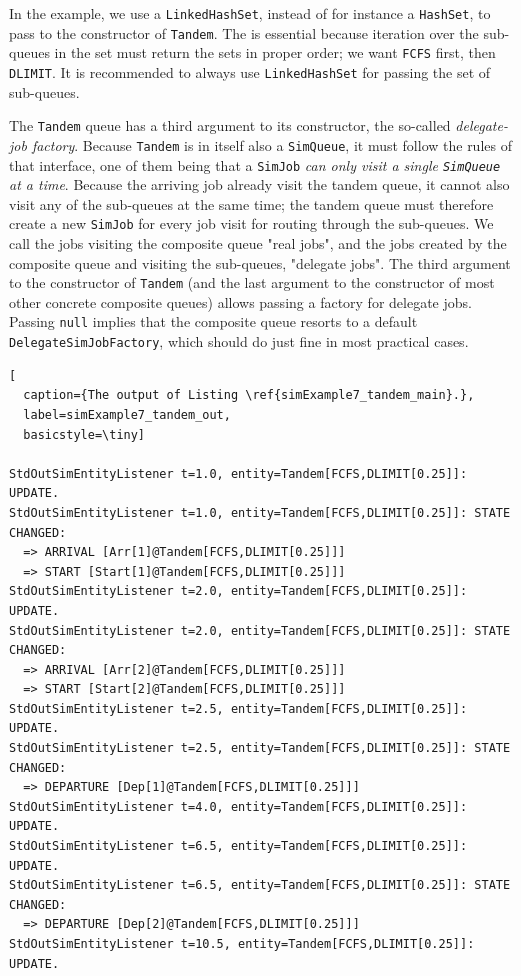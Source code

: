 \documentclass[12pt]{book}
\begin{document}
In the example, we use a \lstinline|LinkedHashSet|,
  instead of for instance a \lstinline|HashSet|,
  to pass to the constructor of \lstinline|Tandem|.
The is essential because iteration over the sub-queues
  in the set must return the sets in proper order;
  we want \lstinline|FCFS| first, then \lstinline|DLIMIT|.
It is recommended to always use \lstinline|LinkedHashSet|
  for passing the set of sub-queues.

The \lstinline|Tandem| queue has a third argument to
  its constructor, the so-called {\em delegate-job factory}.
Because \lstinline|Tandem| is in itself also a \lstinline|SimQueue|,
  it must follow the rules of that interface,
  one of them being that a \lstinline|SimJob|
  {\em can only visit a single \lstinline|SimQueue| at a time}.
Because the arriving job already visit the tandem queue,
  it cannot also visit any of the sub-queues at the same time;
  the tandem queue must therefore create a new \lstinline|SimJob|
  for every job visit for routing through the sub-queues.
We call the jobs visiting the composite queue "real jobs",
  and the jobs created by the composite queue and visiting
  the sub-queues, "delegate jobs".
The third argument to the constructor of \lstinline|Tandem|
  (and the last argument to the constructor of most other
  concrete composite queues)
  allows passing a factory for delegate jobs.
Passing \lstinline|null| implies that the composite queue
  resorts to a default \lstinline|DelegateSimJobFactory|,
  which should do just fine in most practical cases.

\begin{lstfloat}
\begin{lstlisting}[
  caption={The output of Listing \ref{simExample7_tandem_main}.},
  label=simExample7_tandem_out,
  basicstyle=\tiny]

StdOutSimEntityListener t=1.0, entity=Tandem[FCFS,DLIMIT[0.25]]: UPDATE.
StdOutSimEntityListener t=1.0, entity=Tandem[FCFS,DLIMIT[0.25]]: STATE CHANGED:
  => ARRIVAL [Arr[1]@Tandem[FCFS,DLIMIT[0.25]]]
  => START [Start[1]@Tandem[FCFS,DLIMIT[0.25]]]
StdOutSimEntityListener t=2.0, entity=Tandem[FCFS,DLIMIT[0.25]]: UPDATE.
StdOutSimEntityListener t=2.0, entity=Tandem[FCFS,DLIMIT[0.25]]: STATE CHANGED:
  => ARRIVAL [Arr[2]@Tandem[FCFS,DLIMIT[0.25]]]
  => START [Start[2]@Tandem[FCFS,DLIMIT[0.25]]]
StdOutSimEntityListener t=2.5, entity=Tandem[FCFS,DLIMIT[0.25]]: UPDATE.
StdOutSimEntityListener t=2.5, entity=Tandem[FCFS,DLIMIT[0.25]]: STATE CHANGED:
  => DEPARTURE [Dep[1]@Tandem[FCFS,DLIMIT[0.25]]]
StdOutSimEntityListener t=4.0, entity=Tandem[FCFS,DLIMIT[0.25]]: UPDATE.
StdOutSimEntityListener t=6.5, entity=Tandem[FCFS,DLIMIT[0.25]]: UPDATE.
StdOutSimEntityListener t=6.5, entity=Tandem[FCFS,DLIMIT[0.25]]: STATE CHANGED:
  => DEPARTURE [Dep[2]@Tandem[FCFS,DLIMIT[0.25]]]
StdOutSimEntityListener t=10.5, entity=Tandem[FCFS,DLIMIT[0.25]]: UPDATE.

\end{lstlisting}
\end{lstfloat}
\end{document}
